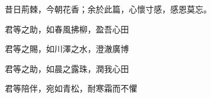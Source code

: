 \newpage
{}
\normalsize


昔日荊棘，今朝花香；余於此篇，心懷寸感，感恩莫忘。

君等之助，如春風拂柳，盈吾心田

君等之賜，如川澤之水，澄澈廣博

君等之助，如晨之露珠，潤我心田

君等陪伴，宛如青松，耐寒霜而不懼